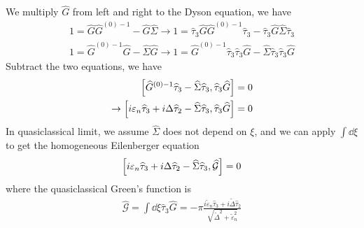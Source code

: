 \documentclass[]{article}
\begin{document}
We multiply $\widehat{G}$ from left and right to the Dyson equation, we have
\begin{align}
    1 = \widehat{G}\widehat{G}^{(0)-1} - \widehat{G}\widehat{\Sigma} \rightarrow
    1 = \widehat{\tau}_3 \widehat{G}\widehat{G}^{(0)-1} \widehat{\tau}_3
    - \widehat{\tau}_3 \widehat{G}\widehat{\Sigma} \widehat{\tau}_3 \\
    1 = \widehat{G}^{(0)-1}\widehat{G} - \widehat{\Sigma}\widehat{G} \rightarrow
    1 = \widehat{G}^{(0)-1}\widehat{\tau}_3\widehat{\tau}_3\widehat{G}
    - \widehat{\Sigma}\widehat{\tau}_3\widehat{\tau}_3\widehat{G}
\end{align}
Subtract the two equations, we have
\begin{align}
    \comm{\widehat{G}^{(0)-1}\widehat{\tau}_3-\widehat{\Sigma}\widehat{\tau}_3}{\widehat{\tau}_3\widehat{G}} & = 0 \\
    \rightarrow \comm{i\varepsilon_n\widehat{\tau}_3 + i\Delta\widehat{\tau}_2 - \widehat{\Sigma}\widehat{\tau}_3}
    {\widehat{\tau}_3\widehat{G}}                                                                            & = 0
\end{align}
In quasiclassical limit, we assume $\widehat{\Sigma}$ does not depend on $\xi$, and we can apply $\int\dd\xi$ to get the
homogeneous Eilenberger equation
\begin{align}
    \comm{i\varepsilon_n\widehat{\tau}_3 + i\Delta\widehat{\tau}_2 - \widehat{\Sigma}\widehat{\tau}_3}
    {\widehat{\mathcal{G}}} = 0
\end{align}
where the quasiclassical Green's function is
\begin{align}
    \widehat{\mathcal{G}} = \int\dd\xi\widehat{\tau}_3\widehat{G}
    = -\pi\frac{i\tilde{\varepsilon}_n\widehat{\tau}_3 + i\tilde{\Delta}\widehat{\tau}_2}
    {\sqrt{\tilde{\Delta}^2 + \tilde{\varepsilon}_n^2}}
\end{align}
\end{document}
